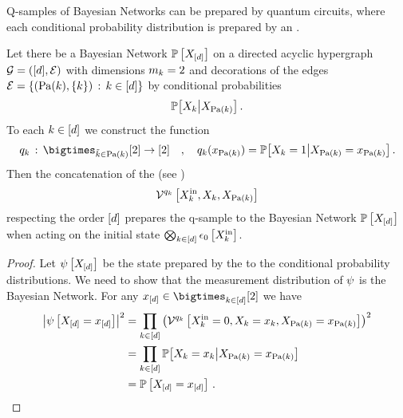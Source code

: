 Q-samples of Bayesian Networks can be prepared by quantum circuits, where each conditional probability distribution is prepared by an \activationCircuit{}.

\begin{theorem}
    Let there be a Bayesian Network $\mathbb{P}\left[X_{[d]}\right]$ on a directed acyclic hypergraph $\mathcal{G}=([d],\mathcal{E})$ with dimensions $m_{k}=2$ and decorations of the edges $\mathcal{E}=\{(\mathrm{Pa}(k),\{k\}) \,:\, k\in[d]\}$ by conditional probabilities
    \begin{align*}
        \mathbb{P}\big[X_{k}\big|X_{\mathrm{Pa}(k)}\big] \, .
    \end{align*}
    To each $k\in[d]$ we construct the function
    \begin{align*}
        \exfunctionof{\catenumerator} \defcols \bigtimes_{\seccatenumerator\in\parentsof{\catenumerator}} [2] \rightarrow [2]
        \quad,\quad
        \exfunctionofat{\catenumerator}{\catindexof{\parentsof{\catenumerator}}}
        = \condprobof{\catvariableof{\catenumerator}=1}{\indexedcatvariableof{\parentsof{\catenumerator}}} \, .
    \end{align*}
    Then the concatenation of the \activationCircuits{} (see )
    \begin{align*}
        \mathcal{V}^{
            q_{k}
        }\left[X_{k}^{\mathrm{in}},X_{k},X_{\mathrm{Pa}(k)}\right]
    \end{align*}
    respecting the order $[d]$ prepares the q-sample to the Bayesian Network $\mathbb{P}\left[X_{[d]}\right]$ when acting on the initial state $\bigotimes_{k\in[d]}\epsilon_{0}\left[X_{k}^{\mathrm{in}}\right]$.
\end{theorem}
\begin{proof}
    Let $\psi\left[X_{[d]}\right]$ be the state prepared by the \activationCircuits{} to the conditional probability distributions.
    We need to show that the measurement distribution of $\psi$ is the Bayesian Network.
    For any $\shortcatindices\in\atomstates$ we have
    \begin{align*}
        \left|\psi\left[X_{[d]}=x_{[d]}\right]\right|^2
        &= \prod_{k\in[d]}
        \left(\mathcal{V}^{
            q_{k}
        }\left[X_{k}^{\mathrm{in}}=0,X_{k}=x_{k},X_{\mathrm{Pa}(k)}=x_{\mathrm{Pa}(k)}\right]\right)^2 \\
        &= \prod_{k\in[d]}
        \mathbb{P}\big[X_{k}=x_{k}\big|X_{\mathrm{Pa}(k)}=x_{\mathrm{Pa}(k)}\big] \\
        & = \mathbb{P}\left[X_{[d]}=x_{[d]}\right] \, .
    \end{align*}
\end{proof}

